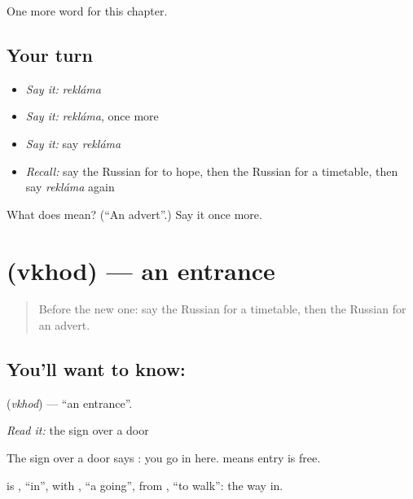 \begin{grammarlens}[title={What you've built}]
One more word for this chapter.
\end{grammarlens}

\subsection*{Your turn}
\begin{itemize}
\raggedright
  \item \emph{Say it:} \emph{rekláma}
  \item \emph{Say it:} \emph{rekláma}, once more
  \item \emph{Say it:} say \emph{rekláma}
  \item \emph{Recall:} say the Russian for to hope, then the Russian for a timetable, then say \emph{rekláma} again
\end{itemize}

\begin{tcolorbox}[breakable,colback=teal!4,colframe=teal!35!black,title={Before you move on}]
What does  mean? (\textquotedblleft{}An advert\textquotedblright{}.) Say it once more.
\end{tcolorbox}
\section[\texorpdfstring{\ru{вход} (vkhod)}{вход (vkhod)}]{ (vkhod) — an entrance}

\label{lesson:RU-C139-vkhod}



\begin{quote}
Before the new one: say the Russian for a timetable, then the Russian for an advert.
\end{quote}

\subsection*{You'll want to know: }
\textbf{} (\emph{vkhod}) — \textquotedblleft{}an entrance\textquotedblright{}.

\emph{Read it:} the sign over a door

The sign over a door says \textbf{}: you go in here. \textbf{ } means entry is free.

\begin{cousinweb}
\textbf{} is \emph{}, \textquotedblleft{}in\textquotedblright{}, with \emph{}, \textquotedblleft{}a going\textquotedblright{}, from \emph{}, \textquotedblleft{}to walk\textquotedblright{}: the way in.
\end{cousinweb}

